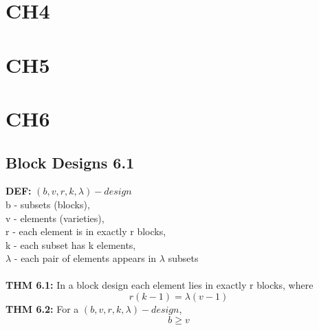 \documentclass[12pt]{article}
\begin{document}
	\section{CH4}
	\section{CH5}
	\section{CH6}
	\subsection{Block Designs 6.1}
	\textbf{DEF:} $ (b,v,r,k,\lambda)-design $ \\
	b - subsets (blocks),\\
	v - elements (varieties),\\
	r - each element is in exactly r blocks, \\
	k - each subset has k elements, \\
	$ \lambda $ - each pair of elements appears in $ \lambda $ subsets\\\\
	\textbf{THM 6.1:} In a block design each element lies in exactly r blocks, where
	\[ 	r(k-1) = \lambda(v-1) \]
	\textbf{THM 6.2:}  For a  $ (b,v,r,k,\lambda)-design $, 
	\[ b \geq v \]
	
\end{document}
